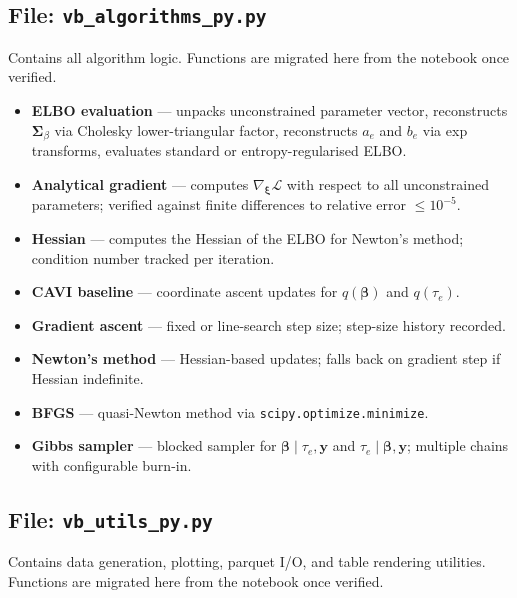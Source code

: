 \documentclass[11pt,a4paper]{article}
\begin{document}
\subsection*{File: \texttt{vb\_algorithms\_py.py}}

Contains all algorithm logic. Functions are migrated here from the notebook once verified.

\begin{itemize}
  \item \textbf{ELBO evaluation} — unpacks unconstrained parameter vector, reconstructs $\bm{\Sigma}_\beta$ via Cholesky lower-triangular factor, reconstructs $a_e$ and $b_e$ via exp transforms, evaluates standard or entropy-regularised ELBO.
  \item \textbf{Analytical gradient} — computes $\nabla_{\bm{\xi}} \mathcal{L}$ with respect to all unconstrained parameters; verified against finite differences to relative error $\leq 10^{-5}$.
  \item \textbf{Hessian} — computes the Hessian of the ELBO for Newton's method; condition number tracked per iteration.
  \item \textbf{CAVI baseline} — coordinate ascent updates for $q(\bm{\beta})$ and $q(\tau_e)$.
  \item \textbf{Gradient ascent} — fixed or line-search step size; step-size history recorded.
  \item \textbf{Newton's method} — Hessian-based updates; falls back on gradient step if Hessian indefinite.
  \item \textbf{BFGS} — quasi-Newton method via \texttt{scipy.optimize.minimize}.
  \item \textbf{Gibbs sampler} — blocked sampler for $\bm{\beta} \mid \tau_e, \bm{y}$ and $\tau_e \mid \bm{\beta}, \bm{y}$; multiple chains with configurable burn-in.
\end{itemize}

\subsection*{File: \texttt{vb\_utils\_py.py}}

Contains data generation, plotting, parquet I/O, and table rendering utilities. Functions are migrated here from the notebook once verified.
\end{document}

